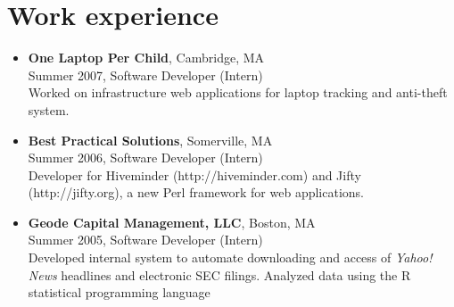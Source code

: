 \documentclass[letterpaper,10pt]{article}
\begin{document}
\section*{Work experience}
\vspace*{-0.2cm}
\begin{itemize}
  \item\textbf{One Laptop Per Child}, Cambridge, MA \\
    Summer 2007, Software Developer (Intern) \\
    Worked on infrastructure web applications for laptop tracking and
    anti-theft system.
  \item \textbf{Best Practical Solutions}, Somerville, MA \\
    Summer 2006, Software Developer (Intern) \\
    Developer for Hiveminder (http://hiveminder.com) and Jifty
    (http://jifty.org), a new Perl framework for web applications.
          
  \item \textbf{Geode Capital Management, LLC}, Boston, MA \\
  Summer 2005, Software Developer (Intern) \\
  Developed internal system to automate downloading and access of {\em
    Yahoo! \textregistered News} headlines and electronic SEC
  filings. Analyzed data using the R statistical programming language
\end{itemize}

\vspace*{-0.7cm}
\end{document}
